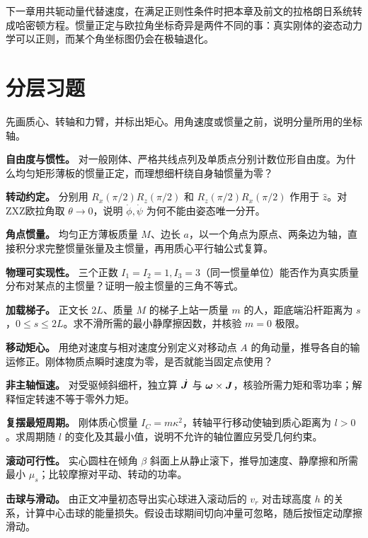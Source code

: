 下一章用共轭动量代替速度，在满足正则性条件时把本章及前文的拉格朗日系统转成哈密顿方程。惯量正定与欧拉角坐标奇异是两件不同的事：真实刚体的姿态动力学可以正则，而某个角坐标图仍会在极轴退化。

\section*{分层习题}
先画质心、转轴和力臂，并标出矩心。用角速度或惯量之前，说明分量所用的坐标轴。

\begin{bookexercises}
\item {} \textbf{自由度与惯性。} 对一般刚体、严格共线点列及单质点分别计数位形自由度。为什么均匀矩形薄板的惯量正定，而理想细杆绕自身轴惯量为零？
\item {} \textbf{转动约定。} 分别用 $R_x(\pi/2)R_z(\pi/2)$ 和 $R_z(\pi/2)R_x(\pi/2)$ 作用于 $\hat z$。对ZXZ欧拉角取 $\theta\to0$，说明 $\dot\phi,\dot\psi$ 为何不能由姿态唯一分开。
\item {} \textbf{角点惯量。} 均匀正方薄板质量 $M$、边长 $a$，以一个角点为原点、两条边为轴，直接积分求完整惯量张量及主惯量，再用质心平行轴公式复算。
\item {} \textbf{物理可实现性。} 三个正数 $I_1=I_2=1,I_3=3$（同一惯量单位）能否作为真实质量分布对某点的主惯量？证明一般主惯量的三角不等式。
\item {} \textbf{加载梯子。} 正文长 $2L$、质量 $M$ 的梯子上站一质量 $m$ 的人，距底端沿杆距离为 $s$，$0\le s\le2L$。求不滑所需的最小静摩擦因数，并核验 $m=0$ 极限。
\item {} \textbf{移动矩心。} 用绝对速度与相对速度分别定义对移动点 $A$ 的角动量，推导各自的输运修正。刚体物质点瞬时速度为零，是否就能当固定点使用？
\item {} \textbf{非主轴恒速。} 对受驱倾斜细杆，独立算 $\dot{\boldsymbol{J}}$ 与 $\boldsymbol{\omega}\times\boldsymbol{J}$，核验所需力矩和零功率；解释恒定转速不等于零外力矩。
\item {} \textbf{复摆最短周期。} 刚体质心惯量 $I_C=m\kappa^2$，转轴平行移动使轴到质心距离为 $l>0$。求周期随 $l$ 的变化及其最小值，说明不允许的轴位置应另受几何约束。
\item {} \textbf{滚动可行性。} 实心圆柱在倾角 $\beta$ 斜面上从静止滚下，推导加速度、静摩擦和所需最小 $\mu_s$；比较摩擦对平动、转动的功率。
\item {} \textbf{击球与滑动。} 由正文冲量初态导出实心球进入滚动后的 $v_r$ 对击球高度 $h$ 的关系，计算中心击球的能量损失。假设击球期间切向冲量可忽略，随后按恒定动摩擦滑动。

\end{bookexercises}
